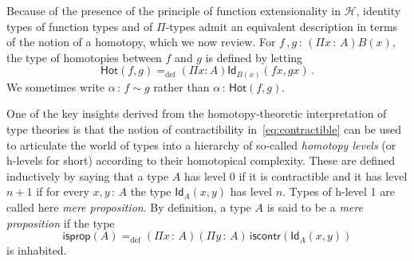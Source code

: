 \documentclass[10pt,a4paper,oneside,reqno]{amsart}
\numberwithin{equation}{section}
\theoremstyle{mythm}
\theoremstyle{mydef}
\theoremstyle{myrmk}
\newcommand{\defeq}{=_{\mathrm{def}}}
\newcommand{\co}{\,{:}\,}
\newcommand{\Hint}{\mathcal{H}}
\newcommand{\iscontr}{\mathsf{iscontr}}
\newcommand{\isprop}{\mathsf{isprop}}
\newcommand{\Hot}{\mathsf{Hot}}
\newcommand{\Id}{\mathsf{Id}}
\begin{document}
Because of the presence of the principle of function extensionality in $\Hint$, 
identity types of function types and of $\Pi$-types admit an equivalent description in terms of the notion of
a homotopy, which we now review.  For $f \, , g \co (\Pi x \co A) B(x)$, the type of homotopies between $f$ and $g$ 
is defined by letting
\[
\Hot(f,g) \defeq (\Pi x:A) \Id_{B(x)}(fx,gx) \, .
\]
We sometimes write  $\alpha \co f \sim g$ rather than $\alpha \co \Hot(f,g)$. 

One of the key insights derived from the homotopy-theoretic interpretation of type theories is that
the notion of contractibility in~\eqref{eq:contractible}  can be used to articulate the world of types  
into a hierarchy of so-called \emph{homotopy levels} (or h-levels for short) according to their homotopical complexity. These
are defined inductively by saying that a type $A$ has level $0$ if it is contractible and it has level
$n+1$ if for every $x, y \co A$ the type $\Id_A(x,y)$ has level $n$. Types of h-level 1 are called 
here \emph{mere proposition}. By definition, a type $A$ is said to be a \emph{mere proposition} if the type
\[
\isprop(A) \defeq (\Pi x \co A)(\Pi  y \co A) \, \iscontr( \Id_A(x,y)) 
\]
is inhabited.
\end{document}
